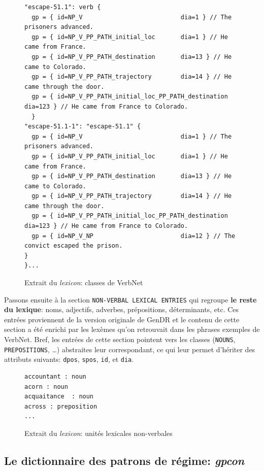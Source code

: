 \begin{figure}[htb]
  \caption{Extrait du \emph{lexicon}: classes de VerbNet}
	\label{fig:vnclass}
\begin{lstlisting}[language=mate]
"escape-51.1": verb {
  gp = { id=NP_V                           dia=1 } // The prisoners advanced.
  gp = { id=NP_V_PP_PATH_initial_loc       dia=1 } // He came from France.
  gp = { id=NP_V_PP_PATH_destination       dia=13 } // He came to Colorado.
  gp = { id=NP_V_PP_PATH_trajectory        dia=14 } // He came through the door.
  gp = { id=NP_V_PP_PATH_initial_loc_PP_PATH_destination dia=123 } // He came from France to Colorado.
  }
"escape-51.1-1": "escape-51.1" {
  gp = { id=NP_V                           dia=1 } // The prisoners advanced.
  gp = { id=NP_V_PP_PATH_initial_loc       dia=1 } // He came from France.
  gp = { id=NP_V_PP_PATH_destination       dia=13 } // He came to Colorado.
  gp = { id=NP_V_PP_PATH_trajectory        dia=14 } // He came through the door.
  gp = { id=NP_V_PP_PATH_initial_loc_PP_PATH_destination dia=123 } // He came from France to Colorado.
  gp = { id=NP_V_NP                        dia=12 } // The convict escaped the prison.
}
}...
\end{lstlisting}
\end{figure}

Passons ensuite à la section \texttt{NON-VERBAL LEXICAL ENTRIES} qui regroupe \textbf{le reste du lexique}: noms, adjectifs, adverbes, prépositions, déterminants, etc. Ces entrées proviennent de la version originale de GenDR \citep{lareau18} et le contenu de cette section a été enrichi par les lexèmes qu'on retrouvait dans les phrases exemples de VerbNet. Bref, les entrées de cette section pointent vers les classes (\texttt{NOUNS}, \texttt{PREPOSITIONS}, \ldots) abstraites leur correspondant, ce qui leur permet d'hériter des attributs suivants: \texttt{dpos}, \texttt{spos}, \texttt{id}, et \texttt{dia}.

\begin{figure}[htb]
  \caption{Extrait du \emph{lexicon}: unités lexicales non-verbales}
	\label{}
\begin{lstlisting}[language=mate]
accountant : noun
acorn : noun
acquaitance  : noun
across : preposition
...
\end{lstlisting}
\end{figure}

\subsection{Le dictionnaire des patrons de régime: \emph{gpcon}}

